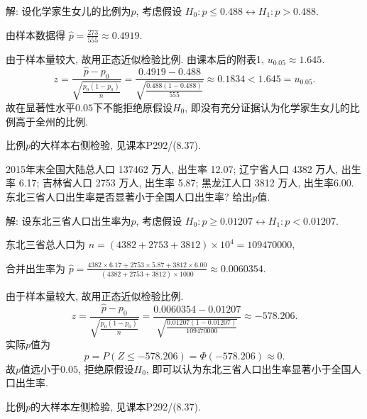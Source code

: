 \documentclass[standard]{ExBook}
\renewenvironment{shaded}{%
  \def\FrameCommand{\fboxsep=\FrameSep \colorbox{shadecolor}}%
  \MakeFramed{\advance\hsize-\width \FrameRestore}%
}{%
  \endMakeFramed
}
\begin{document}
\begin{qitems}
\vspace{\dimexpr2.5cm-5em\relax}

解: 设化学家生女儿的比例为$p$, 考虑假设
$
H_0:p\leq0.488
\longleftrightarrow
H_1:p>0.488
$.

由样本数据得
$
\hat{p}=\frac{273}{555}\approx0.4919
$.

由于样本量较大, 故用正态近似检验比例. 由课本后的附表1, $u_{0.05}\approx1.645$.
$$
z
=
\frac{\hat{p}-p_0}
{\sqrt{\frac{p_0(1-p_0)}{n}}}
=
\frac{0.4919-0.488}
{\sqrt{\frac{0.488(1-0.488)}{555}}}
\approx0.1834
<
1.645
=
u_{0.05}.
$$
故在显著性水平$0.05$下不能拒绝原假设$H_0$, 即没有充分证据认为化学家生女儿的比例高于全州的比例.

\textcolor{themeColor}{\selectfont {} 比例$p$的大样本右侧检验, 见课本P292/(8.37).}

\vspace{2.5cm-5em}

    \begin{bbox}
    \begin{shaded}
        \qitem
2015年末全国大陆总人口 137462 万人, 出生率 12.07\textperthousand; 辽宁省人口 4382 万人, 出生率 6.17\textperthousand; 吉林省人口 2753 万人, 出生率 5.87\textperthousand; 黑龙江人口 3812 万人, 出生率6.00\textperthousand. 东北三省人口出生率是否显著小于全国人口出生率? 给出$p$值.
    \end{shaded}
    \end{bbox}

\vspace{\dimexpr2.5cm-5em\relax}

解: 设东北三省人口出生率为$p$, 考虑假设
$
H_0:p\geq0.01207
\longleftrightarrow
H_1:p<0.01207
$.

东北三省总人口为
$
n=(4382+2753+3812)\times10^4=109470000
$,

合并出生率为
$
\hat{p}
=\frac{4382\times6.17+2753\times5.87+3812\times6.00}
{(4382+2753+3812)\times1000}
\approx0.0060354
$.

由于样本量较大, 故用正态近似检验比例.
$$
z
=
\frac{\hat{p}-p_0}
{\sqrt{\frac{p_0(1-p_0)}{n}}}
=
\frac{0.0060354-0.01207}
{\sqrt{\frac{0.01207(1-0.01207)}{109470000}}}
\approx-578.206.
$$
实际$p$值为
$$
p
=
P(Z\leq-578.206)
=
\Phi(-578.206)
\approx0.
$$
故$p$值远小于$0.05$, 拒绝原假设$H_0$, 即可以认为东北三省人口出生率显著小于全国人口出生率.

\textcolor{themeColor}{\selectfont {} 比例$p$的大样本左侧检验, 见课本P292/(8.37).}

\vspace{2.5cm-5em}


\end{qitems}
\end{document}
